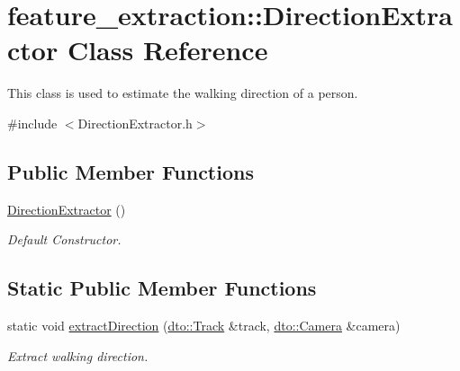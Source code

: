\hypertarget{classfeature__extraction_1_1_direction_extractor}{}\section{feature\+\_\+extraction\+:\+:Direction\+Extractor Class Reference}
\label{classfeature__extraction_1_1_direction_extractor}


This class is used to estimate the walking direction of a person.  




{\ttfamily \#include $<$Direction\+Extractor.\+h$>$}

\subsection*{Public Member Functions}
\begin{DoxyCompactItemize}
\item 
\mbox{\label{classfeature__extraction_1_1_direction_extractor_a98020774d9d033336a0cf1883a94c1a3}} 
\mbox{\hyperlink{classfeature__extraction_1_1_direction_extractor_a98020774d9d033336a0cf1883a94c1a3}{Direction\+Extractor}} ()
\begin{DoxyCompactList}\small\item\em Default Constructor. \end{DoxyCompactList}\end{DoxyCompactItemize}
\subsection*{Static Public Member Functions}
\begin{DoxyCompactItemize}
\item 
\mbox{\label{classfeature__extraction_1_1_direction_extractor_ab5033f52074413779a7318e3aa94de0f}} 
static void \mbox{\hyperlink{classfeature__extraction_1_1_direction_extractor_ab5033f52074413779a7318e3aa94de0f}{extract\+Direction}} (\mbox{\hyperlink{structdto_1_1_track}{dto\+::\+Track}} \&track, \mbox{\hyperlink{structdto_1_1_camera}{dto\+::\+Camera}} \&camera)
\begin{DoxyCompactList}\small\item\em Extract walking direction. \end{DoxyCompactList}\end{DoxyCompactItemize}


